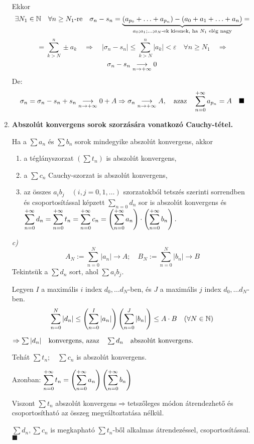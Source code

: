 \documentclass[a4paper,11.5pt]{article}
\begin{document}
\begin{enumerate}
		Ekkor \[\exists N_1\in\mathbb{N}\quad \forall n\geq N_1\text{-re}\quad \sigma_n-s_n=\underbrace{(a_{p_0}+\ldots+a_{p_n})-(a_0+a_1+\ldots+a_n)}_{a_0;a_1;\ldots;a_N\text{-ek kiesnek, ha $N_1$ elég nagy}}=\]
		\[=\sum_{k>N}^n\pm a_k \quad \Rightarrow\quad |\sigma_n-s_n|\leq\sum_{k>N}^n|a_k|<\varepsilon\quad \forall n\geq N_1\quad \Rightarrow\]
		\[\sigma_n - s_n\underset{n\rightarrow+\infty}{\longrightarrow} 0\]
		De:\[ \sigma_n=\sigma_n-s_n+s_n\underset{n\rightarrow+\infty}{\longrightarrow}0+A\Rightarrow \sigma_n\underset{n\rightarrow+\infty}{\longrightarrow} A,\quad  \text{azaz}\quad \displaystyle\sum_{n=0}^{+\infty} a_{p_n}=A\quad \blacksquare \]
		
		\item \textbf{Abszolút konvergens sorok szorzására vonatkozó Cauchy-tétel.}
		
		Ha a $\sum a_n$ és $\sum b_n$ sorok mindegyike abszolút konvergens, akkor 
		\begin{enumerate}
			\item a téglányszorzat $(\sum t_n)$ is abszolút konvergens,
			\item a $\sum c_n$ Cauchy-szorzat is abszolút konvergens,
			\item az összes $a_ib_j \quad (i,j=0,1,\ldots)$ szorzatokból tetszés szerinti sorrendben és csoportosítással képzett $\displaystyle\sum_{n=0} d_n$ sor is abszolút konvergens és $\displaystyle\sum_{n=0}^{+\infty} d_n=\displaystyle\sum_{n=0}^{+\infty} t_n=\displaystyle\sum_{n=0}^{+\infty} c_n=\left(\displaystyle\sum_{n=0}^{+\infty} a_n\right)\cdot\left(\displaystyle\sum_{n=0}^{+\infty} b_n\right).$
		\end{enumerate}
		
		\biz \textit{c)} 
		\[ A_N:=\sum_{n=0}^N|a_n|\rightarrow A;\quad B_N:=\sum_{n=0}^N|b_n|\rightarrow B \]
		Tekintsük a $\sum d_n$ sort, ahol $\sum a_ib_j$. 
		
		Legyen $I$ a maximális $i$ index $d_0,\ldots d_N$-ben, és $J$ a maximális $j$ index $d_0,\ldots d_N$-ben.
		\[ \sum_{n=0}^N|d_n|\leq \left(\sum_{n=0}^I|a_n|\right)\left(\sum_{n=0}^J|b_n|\right)\leq A\cdot B \quad(\forall N\in \mathbb{N}) \]
		
		$\Rightarrow \sum|d_n| \text{\quad konvergens, azaz}\quad \sum d_n \quad\text{abszolút konvergens.}$
		
		Tehát $\sum t_n; \quad\sum c_n$ \quad is abszolút konvergens.
		
		Azonban: $\displaystyle\sum_{n=0}^{+\infty} t_n=\left(\displaystyle\sum_{n=0}^{+\infty} a_n\right)\left(\displaystyle\sum_{n=0}^{+\infty} b_n\right)$
		
		Viszont $\sum t_n$ \quad abszolút konvergens\quad$\Rightarrow$\quad tetszőleges módon átrendezhető és csoportosítható az összeg megváltoztatása nélkül.
		
		$\sum d_n, \sum c_n$ is megkapható $\sum t_n$-ből alkalmas átrendezéssel, csoportosítással. \quad$\blacksquare$
		

\end{enumerate}
\end{document}
